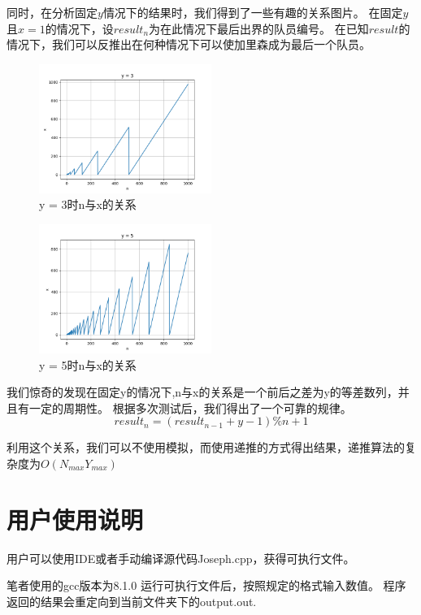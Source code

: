    同时，在分析固定$y$情况下的结果时，我们得到了一些有趣的关系图片。
   在固定$y$且$x = 1$的情况下，设$result_n$为在此情况下最后出界的队员编号。
   在已知$result$的情况下，我们可以反推出在何种情况下可以使加里森成为最后一个队员。

   \begin{figure}[H]
      \centering
      \includegraphics[width=0.5\textwidth]{images/y3.png}
      \caption{y = 3时n与x的关系}
   \end{figure}


   \begin{figure}[H]
      \centering
      \includegraphics[width=0.5\textwidth]{images/y5.png}
      \caption{y = 5时n与x的关系}
   \end{figure}


   我们惊奇的发现在固定y的情况下,n与x的关系是一个前后之差为y的等差数列，并且有一定的周期性。
   根据多次测试后，我们得出了一个可靠的规律。
   $$ result_{n} = (result_{n-1} + y - 1) \% n + 1 $$

   利用这个关系，我们可以不使用模拟，而使用递推的方式得出结果，递推算法的复杂度为$O(N_{max}Y_{max})$

\section{用户使用说明}

   用户可以使用IDE或者手动编译源代码Joseph.cpp，获得可执行文件。
   
   笔者使用的gcc版本为8.1.0
   运行可执行文件后，按照规定的格式输入数值。
   程序返回的结果会重定向到当前文件夹下的output.out.


